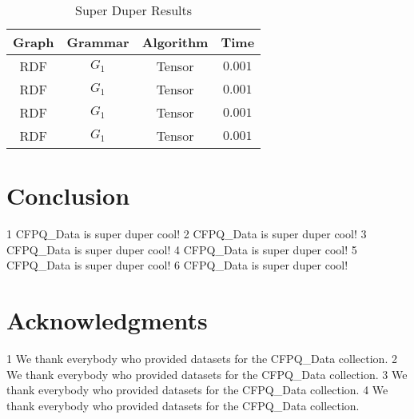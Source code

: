 \documentclass[sigconf]{acmart}
\begin{document}
\begin{table}
  \caption{Super Duper Results}
  \label{tab:results}
  \begin{tabular}{cccc}
    \toprule
    Graph & Grammar & Algorithm & Time\\
    \midrule
    RDF&$G_1$&Tensor&$0.001$\\
    RDF&$G_1$&Tensor&$0.001$\\
    RDF&$G_1$&Tensor&$0.001$\\
    RDF&$G_1$&Tensor&$0.001$\\
  \bottomrule
\end{tabular}
\end{table}

\section{Conclusion}
1 CFPQ\_Data is super duper cool!
2 CFPQ\_Data is super duper cool!
3 CFPQ\_Data is super duper cool!
4 CFPQ\_Data is super duper cool!
5 CFPQ\_Data is super duper cool!
6 CFPQ\_Data is super duper cool!

\section{Acknowledgments}
1 We thank everybody who provided datasets for the CFPQ\_Data collection.
2 We thank everybody who provided datasets for the CFPQ\_Data collection.
3 We thank everybody who provided datasets for the CFPQ\_Data collection.
4 We thank everybody who provided datasets for the CFPQ\_Data collection.


% 
% 

\end{document}
